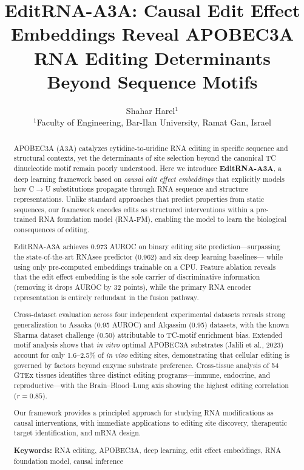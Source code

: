 \documentclass[11pt]{article}
\title{EditRNA-A3A: Causal Edit Effect Embeddings Reveal APOBEC3A \\
RNA Editing Determinants Beyond Sequence Motifs}
\author{
  Shahar Harel$^{1}$ \\
  $^{1}$Faculty of Engineering, Bar-Ilan University, Ramat Gan, Israel \\
}
\date{}
\begin{document}
\maketitle

\begin{abstract}
APOBEC3A (A3A) catalyzes cytidine-to-uridine RNA editing in specific sequence
and structural contexts, yet the determinants of site selection beyond the
canonical TC dinucleotide motif remain poorly understood. Here we introduce
\textbf{EditRNA-A3A}, a deep learning framework based on \emph{causal edit
effect embeddings} that explicitly models how C$\to$U substitutions propagate
through RNA sequence and structure representations. Unlike standard approaches
that predict properties from static sequences, our framework encodes edits
as structured interventions within a pre-trained RNA foundation model (RNA-FM),
enabling the model to learn the biological consequences of editing.

EditRNA-A3A achieves 0.973 AUROC on binary editing site prediction---surpassing
the state-of-the-art RNAsee predictor (0.962) and six deep learning baselines---
while using only pre-computed embeddings trainable on a CPU. Feature ablation
reveals that the edit effect embedding is the sole carrier of discriminative
information (removing it drops AUROC by 32 points), while the primary RNA
encoder representation is entirely redundant in the fusion pathway.

Cross-dataset evaluation across four independent experimental datasets reveals
strong generalization to Asaoka (0.95 AUROC) and Alqassim (0.95) datasets, with
the known Sharma dataset challenge (0.50) attributable to TC-motif enrichment
bias. Extended motif analysis shows that \emph{in vitro} optimal APOBEC3A
substrates (Jalili et al., 2023) account for only 1.6--2.5\% of \emph{in vivo}
editing sites, demonstrating that cellular editing is governed by factors beyond
enzyme substrate preference. Cross-tissue analysis of 54 GTEx tissues identifies
three distinct editing programs---immune, endocrine, and reproductive---with
the Brain--Blood--Lung axis showing the highest editing correlation ($r = 0.85$).

Our framework provides a principled approach for studying RNA modifications
as causal interventions, with immediate applications to editing site discovery,
therapeutic target identification, and mRNA design.

\medskip\noindent
\textbf{Keywords:} RNA editing, APOBEC3A, deep learning, edit effect embeddings,
RNA foundation model, causal inference
\end{abstract}
\end{document}

